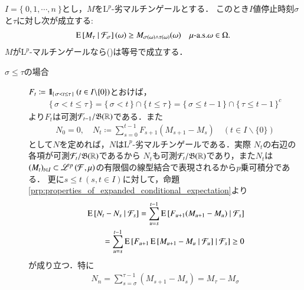 	\begin{screen}
		\begin{thm}[任意抽出定理(1)]
			$I = \{\ 0,1,\cdots,n\ \}$とし，$M$を$\mathrm{L}^p$-劣マルチンゲールとする．
			このとき$I$値停止時刻$\sigma$と$\tau$に対し次が成立する:
			\begin{align}
				\operatorname{E} \left[ M_\tau \ \middle|\ \mathcal{F}_\sigma \right](\omega) \geq M_{\sigma(\omega) \wedge \tau(\omega)}(\omega) \quad \mbox{$\mu$-a.s.}\omega \in \Omega.
				\label{eq:thm_optional_sampling_theorem_1}
			\end{align}
			$M$が$\mathrm{L}^p$-マルチンゲールなら()は等号で成立する．
			\label{thm:optional_sampling_theorem_1}
		\end{thm}
	\end{screen}
	
	\begin{prf}\mbox{}
		\begin{description}
			\item[$\sigma \leq \tau$の場合]
				$F_t \coloneqq \mbox{1}\hspace{-0.25em}\mbox{l}_{\{\, \sigma < t \leq \tau\, \}}\ (t \in I \backslash \{0\})$とおけば，
				\begin{align}
					\{\, \sigma < t \leq \tau\, \} = \{\, \sigma < t\, \} \cap \{\, t \leq \tau\, \} = \{\, \sigma \leq t-1\, \} \cap \{\, \tau \leq t-1\, \}^c
				\end{align}
				より$F_t$は可測$\mathcal{F}_{t-1}/\mathfrak{B}(\mathbb{R})$である．また
				\begin{align}
					N_0 = 0,\quad N_t \coloneqq \sum_{s=0}^{t-1} F_{s+1}(M_{s+1} - M_s) \quad (t \in I \backslash \{0\})
				\end{align}
				として$N$を定めれば，$N$は$\mathrm{L}^p$-劣マルチンゲールである．実際
				$N_t$の右辺の各項が可測$\mathcal{F}_t/\mathfrak{B}(\mathbb{R})$であるから
				$N_t$も可測$\mathcal{F}_t/\mathfrak{B}(\mathbb{R})$であり，また$N_t$は
				$(M_t)_{t \in I} \subset \mathscr{L}^{p} \left(\mathcal{F},\mu\right)$の有限個の線型結合で表現されるから$p$乗可積分である．
				更に$s \leq t\ (s,t \in I)$に対して，命題\ref{prp:properties_of_expanded_conditional_expectation}より
				\begin{align}
					&\operatorname{E} \left[ N_t - N_s \ \middle|\ \mathcal{F}_s \right]
					= \sum_{u=s}^{t-1} \operatorname{E} \left[ F_{u+1}(M_{u+1} - M_u) \ \middle|\ \mathcal{F}_s \right] \\
					&\qquad= \sum_{u=s}^{t-1} \operatorname{E} \left[ F_{u+1}\operatorname{E} \left[ M_{u+1} - M_u \ \middle|\ \mathcal{F}_u \right] \ \middle|\ \mathcal{F}_s \right]
					\geq 0
				\end{align}
				が成り立つ．特に
				\begin{align}
					N_n = \sum_{s=\sigma}^{\tau-1} (M_{s+1} - M_s) = M_\tau - M_\sigma

\end{align}
\end{description}
\end{prf}
